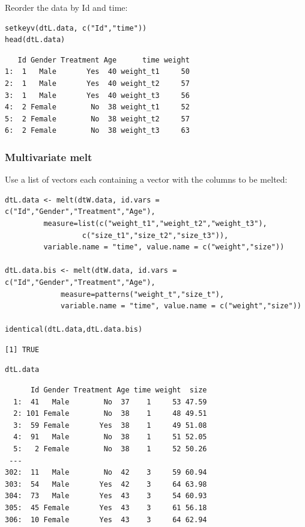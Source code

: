 \documentclass{article}
\begin{document}
Reorder the data by Id and time:
\lstset{language=r,label= ,caption= ,captionpos=b,numbers=none}
\begin{lstlisting}
setkeyv(dtL.data, c("Id","time"))
head(dtL.data)
\end{lstlisting}

\begin{verbatim}
   Id Gender Treatment Age      time weight
1:  1   Male       Yes  40 weight_t1     50
2:  1   Male       Yes  40 weight_t2     57
3:  1   Male       Yes  40 weight_t3     56
4:  2 Female        No  38 weight_t1     52
5:  2 Female        No  38 weight_t2     57
6:  2 Female        No  38 weight_t3     63
\end{verbatim}

\clearpage

\subsubsection{Multivariate melt}
\label{sec:org3fa999f}

Use a list of vectors each containing a vector with the columns to be
melted:
\lstset{language=r,label= ,caption= ,captionpos=b,numbers=none}
\begin{lstlisting}
dtL.data <- melt(dtW.data, id.vars = c("Id","Gender","Treatment","Age"), 
		 measure=list(c("weight_t1","weight_t2","weight_t3"), 
			      c("size_t1","size_t2","size_t3")),
		 variable.name = "time", value.name = c("weight","size"))

dtL.data.bis <- melt(dtW.data, id.vars = c("Id","Gender","Treatment","Age"), 
		     measure=patterns("weight_t","size_t"),
		     variable.name = "time", value.name = c("weight","size"))

identical(dtL.data,dtL.data.bis)
\end{lstlisting}

\begin{verbatim}
[1] TRUE
\end{verbatim}

\lstset{language=r,label= ,caption= ,captionpos=b,numbers=none}
\begin{lstlisting}
dtL.data
\end{lstlisting}

\begin{verbatim}
      Id Gender Treatment Age time weight  size
  1:  41   Male        No  37    1     53 47.59
  2: 101 Female        No  38    1     48 49.51
  3:  59 Female       Yes  38    1     49 51.08
  4:  91   Male        No  38    1     51 52.05
  5:   2 Female        No  38    1     52 50.26
 ---                                           
302:  11   Male        No  42    3     59 60.94
303:  54   Male       Yes  42    3     64 63.98
304:  73   Male       Yes  43    3     54 60.93
305:  45 Female       Yes  43    3     61 56.18
306:  10 Female       Yes  43    3     64 62.94
\end{verbatim}
\end{document}
